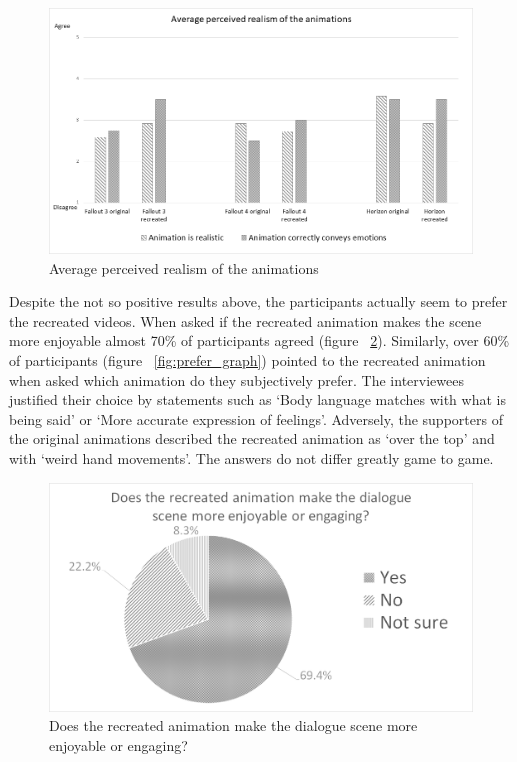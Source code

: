 \begin{figure}[!ht]
	\centerline{\includegraphics[width = 42em]{img/results/realism.png}}
	\caption{Average perceived realism of the animations}\label{fig:realism_graph}
\end{figure}



Despite the not so positive results above, the participants actually seem to prefer the recreated videos. When asked if the recreated animation makes the scene more enjoyable almost 70\% of participants agreed (figure ~\ref{fig:improves_graph}). Similarly, over 60\% of participants (figure ~\ref{fig:prefer_graph}) pointed to the recreated animation when asked which animation do they subjectively prefer. The interviewees justified their choice by statements such as `Body language matches with what is being said' or `More accurate expression of feelings'. Adversely, the supporters of the original animations described the recreated animation as `over the top' and with `weird hand movements'. The answers do not differ greatly game to game.

\begin{figure}[!ht]
	\centerline{\includegraphics[width = 42em]{img/results/improves.png}}
	\caption{Does the recreated animation make the dialogue scene more enjoyable or engaging?}\label{fig:improves_graph}
\end{figure}

